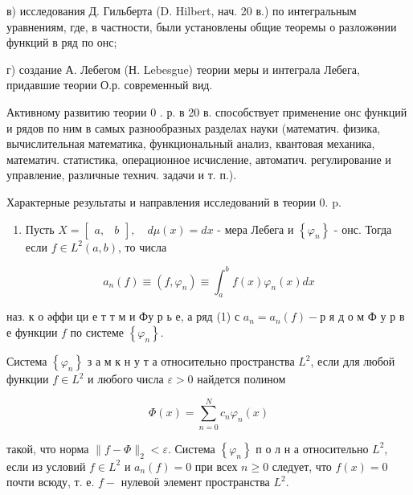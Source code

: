 \documentclass[10pt]{article}
\begin{document}
в) исследования Д. Гильберта (D. Hilbert, нач. 20 в.) по интегральным уравнениям, где, в частности, были установлены общие теоремы о разложөнии функций в ряд по онс;



г) создание А. Лебегом (Н. Lebesgue) теории меры и интеграла Лебега, придавшие теории О.р. современный вид.



Активному развитию теории 0 . р. в 20 в. способствует применение онс функций и рядов по ним в самых разнообразных разделах науки (математич. физика, вычислительная математика, функциональный анализ, квантовая механика, математич. статистика, операционное исчисление, автоматич. регулирование и управление, различные технич. задачи и т. п.).



Характерные результаты и направления исследований в теории 0. p.



\begin{enumerate}

  \item Пусть $X=\left[\begin{array}{ll}a, & b\end{array}\right], \quad d \mu(x)=d x$ - мера Лебега и $\left\{\varphi_{n}\right\}$ - онс. Тогда если $f \in L^{2}(a, b)$, то числа

\end{enumerate}



\[

a_{n}(f) \equiv\left(f, \varphi_{n}\right) \equiv \int_{a}^{b} f(x) \varphi_{n}(x) d x

\]



наз. к о әффи ци е т т м и Фу р ь е, а ряд (1) с $a_{n}=a_{n}(f)-р$ я д о м Ф у р в е функции $f$ по системе $\left\{\varphi_{n}\right\}$.



Система $\left\{\varphi_{n}\right\}$ з а м к н у т а относительно пространства $L^{2}$, если для любой функции $f \in L^{2}$ и любого числа $\varepsilon>0$ найдется полином



\[

\Phi(x)=\sum_{n=0}^{N} c_{n} \varphi_{n}(x)

\]



такой, что норма $\|f-\Phi\|_{2}<\varepsilon$. Система $\left\{\varphi_{n}\right\}$ п о л н а относительно $L^{2}$, если из условий $f \in L^{2}$ и $a_{n}(f)=0$ при всех $n \geqslant 0$ следует, что $f(x)=0$ почти всюду, т. е. $f-$ нулевоӥ элемент пространства $L^{2}$.
\end{document}
